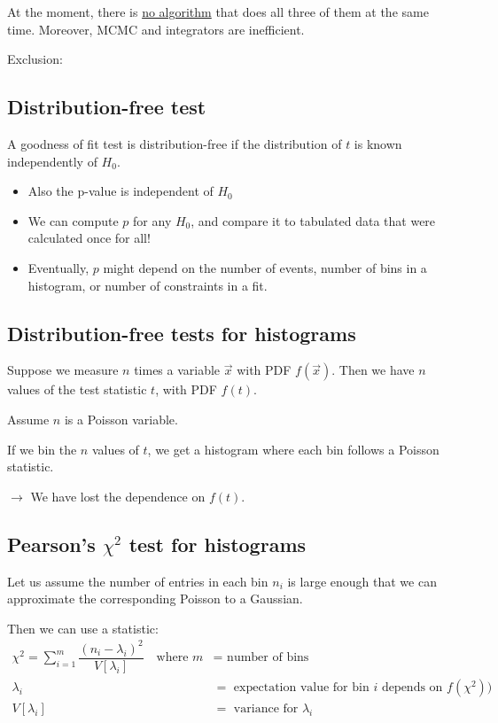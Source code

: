 At the moment, there is \underline{no algorithm} that does all three of them at the same time. Moreover, MCMC and integrators are inefficient.


Exclusion: 

\subsection{Distribution-free test}
A goodness of fit test is distribution-free if the distribution of $t$ is known independently of $H_0$.
\begin{itemize}[$\to$]
  \item Also the p-value is independent of $H_0$
  \item We can compute $p$ for any $H_0$, and compare it to tabulated data that were calculated once for all!
  \item Eventually, $p$ might depend on the number of events, number of bins in a histogram, or number of constraints in a fit. 
\end{itemize}

\subsection{Distribution-free tests for histograms}
Suppose we measure $n$ times a variable $\vec{x}$ with PDF $f(\vec{x})$. Then we have $n$ values of the test statistic $t$, with PDF $f(t)$. 

Assume $n$ is a Poisson variable. 

If we bin the $n$ values of $t$, we get a histogram where each bin follows a Poisson statistic. 

$\to$ We have lost the dependence on $f(t)$.

\subsection{Pearson's $\chi^2$ test for histograms}
Let us assume the number of entries in each bin $n_i$ is large enough that we can approximate the corresponding Poisson to a Gaussian. 

Then we can use a statistic:
\begin{align}
  \chi^2 = \sum \limits_{i=1}^m \dfrac{(n_i - \lambda_i)^2}{V[\lambda_i]} \quad \text{where } m&=\text{ number of bins} \nonumber \\
  \lambda_i &= \text{ expectation value for bin } i \text{ depends on } f(\chi^2)) \nonumber \\
  V[\lambda_i] &= \text{ variance for } \lambda_i
\end{align}

